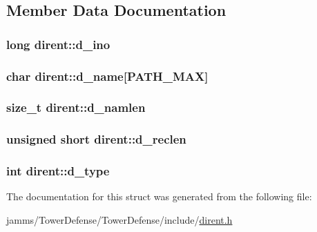 \subsection{Member Data Documentation}
\hypertarget{structdirent_acb6fecfb0e0f6fdc226dff8d56c3da4a}{
\subsubsection[{d\+\_\+ino}]{\setlength{\rightskip}{0pt plus 5cm}long dirent\+::d\+\_\+ino}}\label{structdirent_acb6fecfb0e0f6fdc226dff8d56c3da4a}
\hypertarget{structdirent_a6c68ac080755453ec52de202e91de59b}{
\subsubsection[{d\+\_\+name}]{\setlength{\rightskip}{0pt plus 5cm}char dirent\+::d\+\_\+name\mbox{[}{\bf P\+A\+T\+H\+\_\+\+M\+A\+X}\mbox{]}}}\label{structdirent_a6c68ac080755453ec52de202e91de59b}
\hypertarget{structdirent_a09ced068b03cdb339e34840c8b709621}{
\subsubsection[{d\+\_\+namlen}]{\setlength{\rightskip}{0pt plus 5cm}size\+\_\+t dirent\+::d\+\_\+namlen}}\label{structdirent_a09ced068b03cdb339e34840c8b709621}
\hypertarget{structdirent_a90dc47836e8ef510437317876368859e}{
\subsubsection[{d\+\_\+reclen}]{\setlength{\rightskip}{0pt plus 5cm}unsigned short dirent\+::d\+\_\+reclen}}\label{structdirent_a90dc47836e8ef510437317876368859e}
\hypertarget{structdirent_ad6a736cb04c7295e8f97f708324b3500}{
\subsubsection[{d\+\_\+type}]{\setlength{\rightskip}{0pt plus 5cm}int dirent\+::d\+\_\+type}}\label{structdirent_ad6a736cb04c7295e8f97f708324b3500}


The documentation for this struct was generated from the following file\+:\begin{DoxyCompactItemize}
\item 
jamms/\+Tower\+Defense/\+Tower\+Defense/include/\hyperlink{dirent_8h}{dirent.\+h}\end{DoxyCompactItemize}
